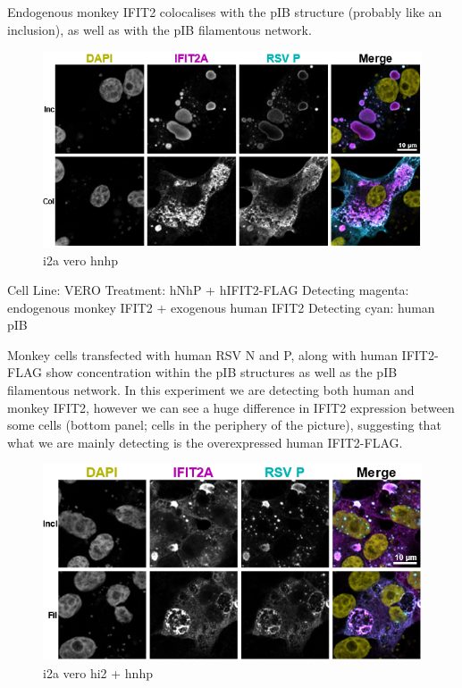 Endogenous monkey IFIT2 colocalises with the pIB structure (probably like an inclusion), as well as with the pIB filamentous network.

\begin{figure}
    \centering
    \includegraphics[width=1\linewidth]{09. Chapter 4//Figs//01. I2A/02. i2a vero hnhp.png}
    \caption[i2a vero hnhp]{i2a vero hnhp}
    \label{i2a vero hnhp}
\end{figure}

Cell Line: VERO \newline
Treatment: hNhP + hIFIT2-FLAG \newline
Detecting magenta: endogenous monkey IFIT2 + exogenous human IFIT2 \newline
Detecting cyan: human pIB \newline

Monkey cells transfected with human RSV N and P, along with human IFIT2-FLAG show concentration within the pIB structures as well as the pIB filamentous network. In this experiment we are detecting both human and monkey IFIT2, however we can see a huge difference in IFIT2 expression between some cells (bottom panel; cells in the periphery of the picture), suggesting that what we are mainly detecting is the overexpressed human IFIT2-FLAG.

\begin{figure}
    \centering
    \includegraphics[width=1\linewidth]{09. Chapter 4//Figs//01. I2A/03. i2a vero hi2 hnhp.png}
    \caption[i2a vero hi2 + hnhp]{i2a vero hi2 + hnhp}
    \label{i2a vero hi2 + hnhp}
\end{figure}

